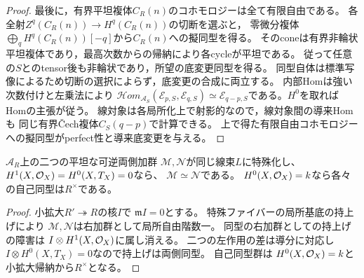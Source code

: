 \begin{proof}
最後に，有界平坦複体$C_R(n)$のコホモロジーは全て有限自由である。
各全射$Z^q(C_R(n))\to H^q(C_R(n))$の切断を選ぶと，
零微分複体$\bigoplus_qH^q(C_R(n))[-q]$から$C_R(n)$への擬同型を得る。
そのconeは有界非輪状平坦複体であり，最高次数からの帰納により各cycleが平坦である。
従って任意の$S$とのtensor後も非輪状であり，所望の底変更同型を得る。
同型自体は標準写像によるため切断の選択によらず，底変更の合成に両立する。
内部Homは強い次数付けと左乗法により
$\mathcal H om_{\mathscr A_S}(\mathscr E_{p,S},\mathscr E_{q,S})
\simeq\mathscr E_{q-p,S}$である。$H^0$を取ればHomの主張が従う。
線対象は各局所化上で射影的なので，線対象間の導来Homも
同じ有界\v{C}ech複体$C_S(q-p)$で計算できる。
上で得た有限自由コホモロジーへの擬同型がperfect性と導来底変更を与える。
\end{proof}

\begin{lemma}[可逆両側偏極の同型類の一意性]
\label{lem:artin-polarization}
$\mathscr A_R$上の二つの平坦な可逆両側加群
$\mathscr M,\mathscr N$が同じ線束$L$に特殊化し、
$H^1(X,\mathcal O_X)=H^0(X,T_X)=0$なら、
$\mathscr M\simeq\mathscr N$である。
$H^0(X,\mathcal O_X)=k$なら各々の自己同型は$R^\times$である。
\end{lemma}
\begin{proof}
小拡大$R'\twoheadrightarrow R$の核$I$で
$\mathfrak mI=0$とする。
特殊ファイバーの局所基底の持上げにより
$\mathscr M,\mathscr N$は右加群として局所自由階数一。
同型の右加群としての持上げの障害は
$I\otimes H^1(X,\mathcal O_X)$に属し消える。
二つの左作用の差は導分に対応し
$I\otimes H^0(X,T_X)=0$なので持上げは両側同型。
自己同型群は
$H^0(X,\mathcal O_X)=k$と小拡大帰納から$R^\times$となる。
\end{proof}

